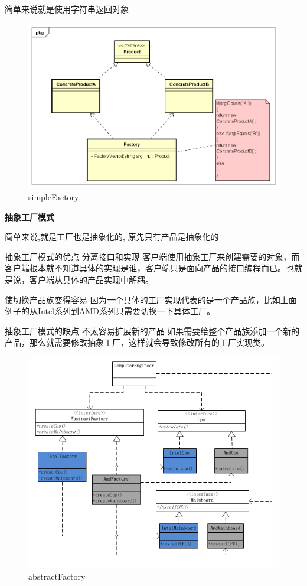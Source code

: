 \documentclass[UTF8]{ctexart}
\begin{document}
简单来说就是使用字符串返回对象
\begin{figure}
	\centering
	\includegraphics[width=0.7\linewidth]{figures/simpleFactory.png}
	\caption{simpleFactory}
	\label{fig:simpleFactory}
\end{figure}

\textbf{抽象工厂模式}

简单来说,就是工厂也是抽象化的, 原先只有产品是抽象化的

抽象工厂模式的优点
分离接口和实现
客户端使用抽象工厂来创建需要的对象，而客户端根本就不知道具体的实现是谁，客户端只是面向产品的接口编程而已。也就是说，客户端从具体的产品实现中解耦。

使切换产品族变得容易
因为一个具体的工厂实现代表的是一个产品族，比如上面例子的从Intel系列到AMD系列只需要切换一下具体工厂。

抽象工厂模式的缺点
不太容易扩展新的产品
如果需要给整个产品族添加一个新的产品，那么就需要修改抽象工厂，这样就会导致修改所有的工厂实现类。

\begin{figure}
	\centering
	\includegraphics[width=0.7\linewidth]{figures/abstractFactory.png}
	\caption{abstractFactory}
	\label{fig:abstractFactory}
\end{figure}
\end{document}
